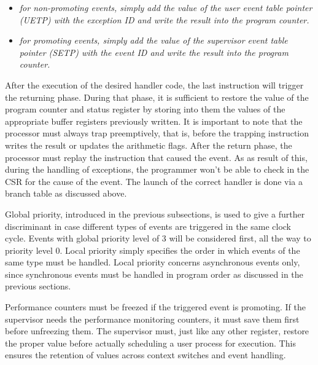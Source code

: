 \documentclass{article}
\begin{document}
\begin{enumerate}
\begin{itemize}
                        \item \textit{for non-promoting events, simply add the value of the user event table pointer (UETP) with the exception ID and write the result into the program counter.}

                        \item \textit{for promoting events, simply add the value of the supervisor event table pointer (SETP) with the event ID and write the result into the program counter.}

                    \end{itemize}

            \end{enumerate}

            After the execution of the desired handler code, the last instruction will trigger the returning phase. During that phase, it is sufficient to restore the value of the program counter and status register by storing into them the values of the appropriate buffer registers previously written. It is important to note that the processor must always trap preemptively, that is, before the trapping instruction writes the result or updates the arithmetic flags. After the return phase, the processor must replay the instruction that caused the event. As as result of this, during the handling of exceptions, the programmer won't be able to check in the CSR for the cause of the event. The launch of the correct handler is done via a branch table as discussed above.

            \vspace{10pt} 

            Global priority, introduced in the previous subsections, is used to give a further discriminant in case different types of events are triggered in the same clock cycle. Events with global priority level of 3 will be considered first, all the way to priority level 0. Local priority simply specifies the order in which events of the same type must be handled. Local priority concerns asynchronous events only, since synchronous events must be handled in program order as discussed in the previous sections.

            \vspace{10pt}

            Performance counters must be freezed if the triggered event is promoting. If the supervisor needs the performance monitoring counters, it must save them first before unfreezing them. The supervisor must, just like any other register, restore the proper value before actually scheduling a user process for execution. This ensures the retention of values across context switches and event handling.
\end{document}
